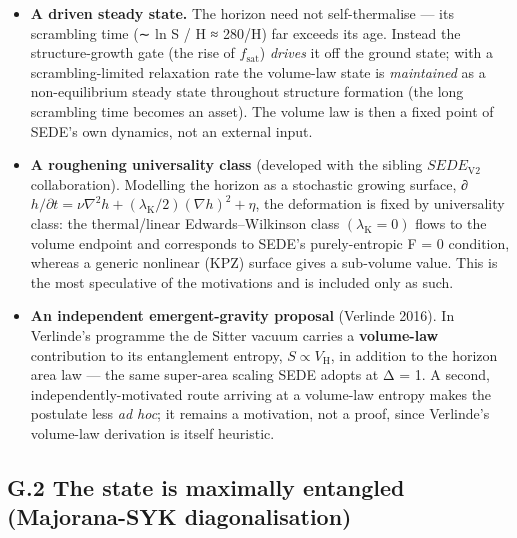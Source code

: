 \documentclass[
  10pt,
]{article}
\providecommand{\tightlist}{%
  \setlength{\itemsep}{0pt}\setlength{\parskip}{0pt}}
\begin{document}
\begin{itemize}
\tightlist
\item
  \textbf{A driven steady state.} The horizon need not self-thermalise
  --- its scrambling time (∼ ln S / H ≈ 280/H) far exceeds its age.
  Instead the structure-growth gate (the rise of \(f_{\mathrm{sat}}\))
  \emph{drives} it off the ground state; with a scrambling-limited
  relaxation rate the volume-law state is \emph{maintained} as a
  non-equilibrium steady state throughout structure formation (the long
  scrambling time becomes an asset). The volume law is then a fixed
  point of SEDE's own dynamics, not an external input.
\item
  \textbf{A roughening universality class} (developed with the sibling
  \(SEDE_{\mathrm{V2}}\) collaboration). Modelling the horizon as a
  stochastic growing surface,
  ∂\(h/\partial t = \nu \nabla ^{2}h + (\lambda _{\mathrm{K}}/2)(\nabla h)^{2} + \eta\),
  the deformation is fixed by universality class: the thermal/linear
  Edwards--Wilkinson class \((\lambda _{\mathrm{K}} = 0)\) flows to the
  volume endpoint and corresponds to SEDE's purely-entropic F = 0
  condition, whereas a generic nonlinear (KPZ) surface gives a
  sub-volume value. This is the most speculative of the motivations and
  is included only as such.
\item
  \textbf{An independent emergent-gravity proposal} (Verlinde 2016). In
  Verlinde's programme the de Sitter vacuum carries a
  \textbf{volume-law} contribution to its entanglement entropy,
  \(S \propto  V_{\mathrm{H}}\), in addition to the horizon area law ---
  the same super-area scaling SEDE adopts at Δ = 1. A second,
  independently-motivated route arriving at a volume-law entropy makes
  the postulate less \emph{ad hoc}; it remains a motivation, not a
  proof, since Verlinde's volume-law derivation is itself heuristic.
\end{itemize}

\subsection{G.2 The state is maximally entangled (Majorana-SYK
diagonalisation)}\label{g.2-the-state-is-maximally-entangled-majorana-syk-diagonalisation}
\end{document}
